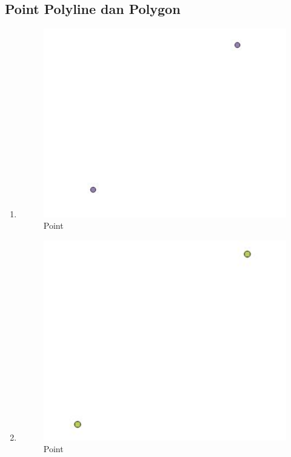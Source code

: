 \subsection{Point Polyline dan Polygon}
\begin{enumerate}
	\item 
	
	\begin{figure}[H]
		\includegraphics[width=12cm]{figures/1174042/No1.JPG}
		\centering
		\caption{Point}
	\end{figure}
	
	\item 
	
	\begin{figure}[H]
		\includegraphics[width=12cm]{figures/1174042/No2.JPG}
		\centering
		\caption{Point}
	\end{figure}
	

\end{enumerate}
